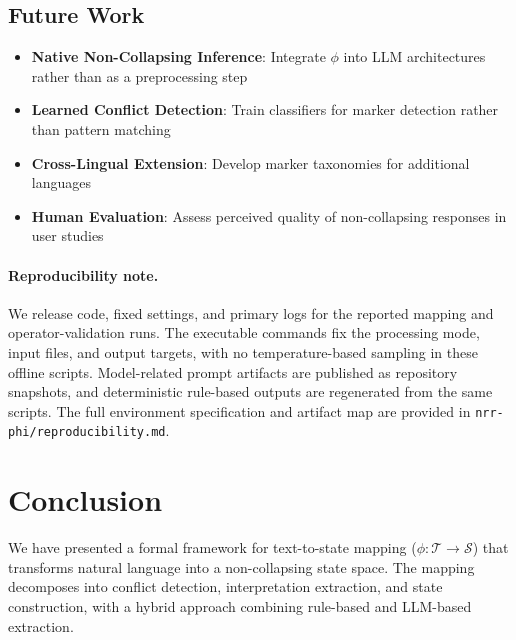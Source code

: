 \documentclass[11pt,a4paper]{article}
\begin{document}
\subsection{Future Work}

\begin{itemize}
    \item \textbf{Native Non-Collapsing Inference}: Integrate $\phi$ into LLM 
          architectures rather than as a preprocessing step
    \item \textbf{Learned Conflict Detection}: Train classifiers for marker 
          detection rather than pattern matching
    \item \textbf{Cross-Lingual Extension}: Develop marker taxonomies for 
          additional languages
    \item \textbf{Human Evaluation}: Assess perceived quality of non-collapsing 
          responses in user studies
\end{itemize}

\paragraph{Reproducibility note.}
We release code, fixed settings, and primary logs for the reported mapping and operator-validation runs.
The executable commands fix the processing mode, input files, and output targets, with no temperature-based sampling in these offline scripts.
Model-related prompt artifacts are published as repository snapshots, and deterministic rule-based outputs are regenerated from the same scripts.
The full environment specification and artifact map are provided in \texttt{nrr-phi/reproducibility.md}.

\section{Conclusion}
\label{sec:conclusion}

We have presented a formal framework for text-to-state mapping ($\phi: \mathcal{T} \to \mathcal{S}$) 
that transforms natural language into a non-collapsing state space. The mapping 
decomposes into conflict detection, interpretation extraction, and state construction, 
with a hybrid approach combining rule-based and LLM-based extraction.
\end{document}

